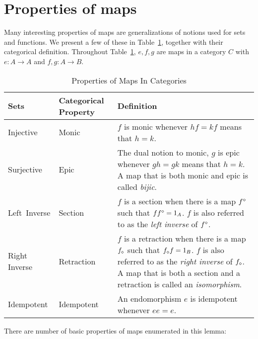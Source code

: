 \section{Properties of maps} %
\label{sub:properties_of_maps}
Many interesting properties of maps are generalizations of notions used for sets and functions. We
present a few of these in Table~\ref{tab:properties_of_maps_in_categories}, together with their
categorical definition. Throughout Table~\ref{tab:properties_of_maps_in_categories}, $e,f,g$ are
maps in a category $C$ with $e:A \to A$ and $f,g:A \to B$.
\begin{table}[!htbp]
  \begin{center}
    \begin{tabular}{|p{1in}p{1in}p{3.73in}|}
      \hline
      {\bf Sets} & {\bf Categorical Property} & {\bf Definition}\\
      \hline
      \hline
      Injective & Monic & $f$ is monic whenever $h f = k f$ means that $h = k$.\\
      \hline
      Surjective & Epic & The dual notion to monic, $g$ is epic whenever $g h = g k$ means that $h = k$.
      A map that is both monic and epic is called \emph{bijic}.\\
      \hline
      Left~Inverse & Section & $f$ is a section when there is a map ${f}^\diamond$ such that $f {f}^\diamond = 1_A$. $f$
      is also referred to as the \emph{left inverse} of ${f}^\diamond$.\\
      \hline
      Right Inverse & Retraction & $f$ is a retraction when there is a map ${f}_\diamond$ such that ${f}_\diamond f = 1_B$.
      $f$ is also referred to as the \emph{right inverse} of ${f}_\diamond$. A map that is both a section and a
      retraction is called an \emph{isomorphism}.\\
      \hline
      Idempotent & Idempotent & An endomorphism $e$ is idempotent whenever $e e = e$.\\
      \hline
    \end{tabular}
  \end{center}
  \caption{Properties of Maps In Categories}
  \label{tab:properties_of_maps_in_categories}
\end{table}

There are number of basic properties of maps enumerated in this lemma:

